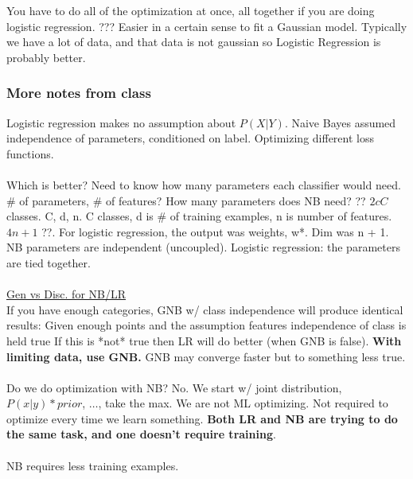You have to do all of the optimization at once, all together if you are doing logistic regression.  ???
Easier in a certain sense to fit a Gaussian model. 
Typically we have a lot of data, and that data is not gaussian so Logistic Regression is probably better. 
\hfill \\

\subsubsection{More notes from class}  %
Logistic regression makes no assumption about $P(X|Y)$.  
Naive Bayes assumed independence of parameters, conditioned on label.
Optimizing different loss functions.  \hfill \\
\hfill \\ 

Which is better? 
Need to know how many parameters each classifier would need. 
\# of parameters, \# of features? 
How many parameters does NB need? 
?? $2cC$ classes. C, d, n.  C classes, d is \# of training examples, n is number of features.
$4n + 1$ ??.
For logistic regression, the output was weights, w*.  Dim was n + 1. 
NB parameters are independent (uncoupled).
Logistic regression: the parameters are tied together.  \hfill \\
\hfill \\

\underline{Gen vs Disc. for NB/LR} \hfill \\
If you have enough categories, GNB w/ class independence will produce identical results:
Given enough points and the assumption features independence of class is held true
If this is *not* true then LR will do better (when GNB is false). 
\textbf{With limiting data, use GNB. }
GNB may converge faster but to something less true.  \hfill \\
\hfill \\

Do we do optimization with NB?  No.
We start w/ joint distribution,  $P(x|y)*prior$, $\dots$, take the max.
 We are not ML optimizing.  Not required to optimize every time we learn something. 
\textbf{Both LR and NB are trying to do the same task, and one doesn't require training}. 
\hfill \\  \hfill \\

NB requires less training examples. 
\hfill \\  \hfill \\

